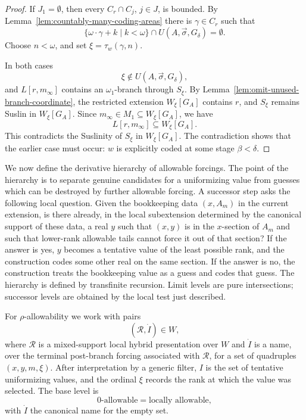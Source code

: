 \documentclass[a4paper,11pt]{article}
\begin{document}
\begin{proof}
If \(J_1=\emptyset\), then every \(C_r\cap C_j\), \(j\in J\), is bounded.  By
Lemma~\ref{lem:countably-many-coding-areas} there is \(\gamma\in C_r\) such that
\[
   \{\omega\cdot\gamma+k\mid k<\omega\}
   \cap U(A,\vec\sigma,G_\delta)=\emptyset.
\]
Choose \(n<\omega\), and set \(\xi=\tau_w(\gamma,n)\).

In both cases
\[
   \xi\notin U(A,\vec\sigma,G_\delta),
\]
and \(L[r,m_\infty]\) contains an \(\omega_1\)-branch through \(S_\xi\).  By
Lemma~\ref{lem:omit-unused-branch-coordinate}, the restricted extension
\(W_\xi[G_A]\) contains \(r\), and \(S_\xi\) remains Suslin in
\(W_\xi[G_A]\).  Since \(m_\infty\in M_1\subseteq W_\xi[G_A]\), we have
\[
   L[r,m_\infty]\subseteq W_\xi[G_A].
\]
This contradicts the Suslinity of \(S_\xi\) in \(W_\xi[G_A]\).  The contradiction
shows that the earlier case must occur: \(w\) is explicitly coded at some stage
\(\beta<\delta\).
\end{proof}


We now define the derivative hierarchy of allowable forcings.  The point of
the hierarchy is to separate genuine candidates for a uniformizing value from
guesses which can be destroyed by further allowable forcing.  A successor step
asks the following local question.  Given the bookkeeping data \((x,A_m)\) in
the current extension, is there already, in the local subextension determined
by the canonical support of these data, a real \(y\) such that \((x,y)\) is in
the \(x\)-section of \(A_m\) and such that lower-rank allowable tails cannot
force it out of that section?  If the answer is yes, \(y\) becomes a tentative
value of the least possible rank, and the construction codes some other real
on the same section.  If the answer is no, the construction treats the
bookkeeping value as a guess and codes that guess.  The hierarchy is defined
by transfinite recursion.  Limit levels are pure intersections; successor
levels are obtained by the local test just described.

For \(\rho\)-allowability we work with pairs
\[
   (\mathcal R,\dot I)\in W,
\]
where \(\mathcal R\) is a mixed-support local hybrid presentation over \(W\) and
\(\dot I\) is a name, over the terminal post-branch forcing associated with
\(\mathcal R\), for a set of quadruples \((x,y,m,\xi)\).  After interpretation by a generic filter, \(I\) is the set
of tentative uniformizing values, and the ordinal \(\xi\) records the rank at
which the value was selected.  The base level is
\[
   0\text{-allowable}=\text{locally allowable},
\]
with \(\dot I\) the canonical name for the empty set.
\end{document}
